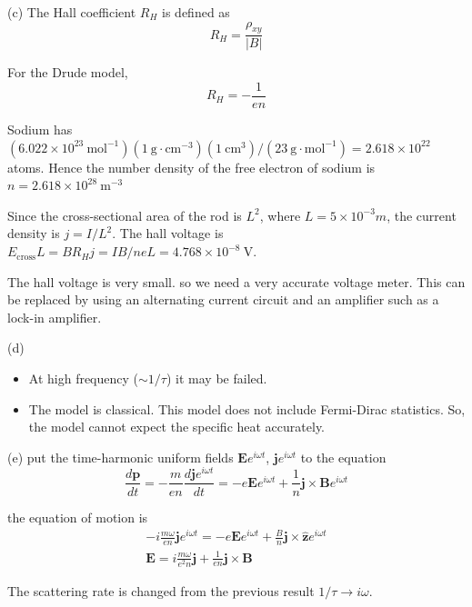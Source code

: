 \documentclass[a4paper,11pt]{article}
\begin{document}
(c)
The Hall coefficient $R_H$ is defined as
\begin{equation}
    R_H = \frac{\rho_{xy}}{|B|}
\end{equation}

For the Drude model,
\begin{equation}
    R_H = -\frac{1}{en}
\end{equation}

Sodium has $(6.022\times10^{23}\ \mathrm{mol}^{-1})(1\ \mathrm{g}\cdot\mathrm{cm}^{-3})(1\ \mathrm{cm}^3)/(23\  \mathrm{g}\cdot\mathrm{mol}^{-1}) = 2.618×10^{22}$ atoms. Hence the number density of the free electron of sodium is $n = 2.618×10^{28}\ \mathrm{m^{-3}}$

Since the cross-sectional area of the rod is $L^2$, where $L = 5 \times 10^{-3} m$, the current density is $j=I/L^2$. The hall voltage is $E_\text{cross}L=BR_Hj={IB/neL}=4.768 \times 10^{-8}\ \mathrm{V}$.

The hall voltage is very small. so we need a very accurate voltage meter. This can be replaced by using an alternating current circuit and an amplifier such as a lock-in amplifier.

(d)
\begin{itemize}
    \item At high frequency ($\sim 1/\tau$) it may be failed. 
    \item The model is classical. This model does not include Fermi-Dirac statistics. So, the model cannot expect the specific heat accurately.
\end{itemize}

(e) put the time-harmonic uniform fields $\mathbf Ee^{i\omega t}$, $\mathbf je^{i\omega t}$ to the equation
\begin{equation}
    \frac{d\mathbf p}{dt}=-\frac{m}{en}\frac{d\mathbf j e^{i\omega t}}{dt}=-e\mathbf Ee^{i\omega t} +\frac{1}{n}\mathbf j\times \mathbf Be^{i\omega t}
\end{equation}

the equation of motion is
\begin{gather}
    -i\frac{m\omega}{en}\mathbf je^{i\omega t}=-e{\mathbf E}e^{i\omega t} +\frac{B}{n}\mathbf j\times \hat{\mathbf z}e^{i\omega t} \\
    {\mathbf E}=i\frac{m\omega}{e^2n}\mathbf j +\frac{1}{en}\mathbf j\times {\mathbf B}
\end{gather}

The scattering rate is changed from the previous result $1/\tau\rightarrow i\omega$.
\end{document}
